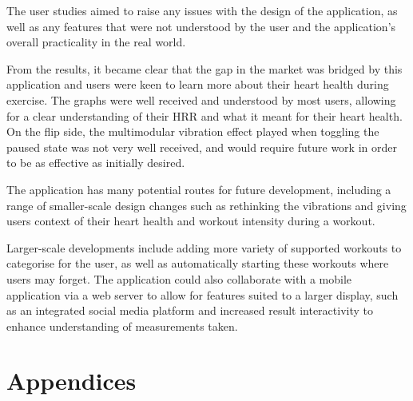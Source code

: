 \documentclass{l4proj}
\begin{document}
The user studies aimed to raise any issues with the design of the application, as well as any features that were not understood by the user and the application’s overall practicality in the real world.

From the results, it became clear that the gap in the market was bridged by this application and users were keen to learn more about their heart health during exercise. The graphs were well received and understood by most users, allowing for a clear understanding of their HRR and what it meant for their heart health. On the flip side, the multimodular vibration effect played when toggling the paused state was not very well received, and would require future work in order to be as effective as initially desired.

The application has many potential routes for future development, including a range of smaller-scale design changes such as rethinking the vibrations and giving users context of their heart health and workout intensity during a workout.

Larger-scale developments include adding more variety of supported workouts to categorise for the user, as well as automatically starting these workouts where users may forget. The application could also collaborate with a mobile application via a web server to allow for features suited to a larger display, such as an integrated social media platform and increased result interactivity to enhance understanding of measurements taken.

%
% 



\renewcommand{\thechapter}{A}
\chapter{Appendices}
\label{sec:appendices}
\end{document}
